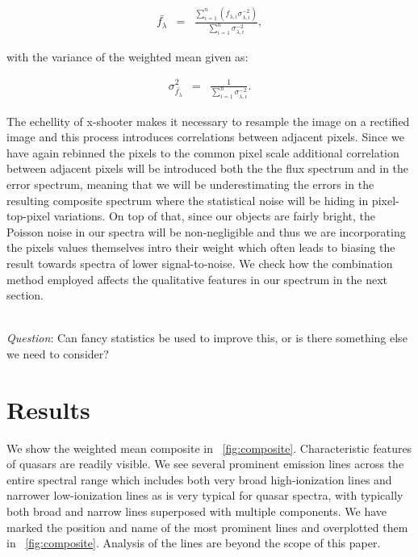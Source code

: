 \documentclass{aa}    %
\newcommand{\figref}[1]{\ref{fig:#1}}
\newcommand{\Fig}[1]{\figurename~\figref{#1}}
\newcommand{\fig}[1]{\Fig{#1}}
\newcommand{\eqlabel}[1]{\label{eq:#1}}
\newcommand{\sectlabel}[1]{\label{sect:#1}}
\newcommand{\todo}[3]{{\color{#2}\emph{#1}: #3}}
\newcommand{\qtodo}[1]{\todo{\\ Question}{red}{#1}}
\begin{document}
\begin{eqnarray} \eqlabel{wmean}
\bar{f_{\lambda}} &=& \frac{ \sum_{i=1}^n \left( f_{\lambda, i} \sigma_{\lambda, i}^{-2} \right)}{\sum_{i=1}^n \sigma_{\lambda, i}^{-2}},
\end{eqnarray}

with the variance of the weighted mean given as: 
 
\begin{eqnarray} \eqlabel{sigma-wmean}
\sigma_{\bar{f_{\lambda}}}^2 &=& \frac{ 1 }{\sum_{i=1}^n \sigma_{\lambda, i}^{-2}}.
\end{eqnarray}

The echellity of x-shooter makes it necessary to resample the image on a rectified image and this process introduces correlations between adjacent pixels. Since we have again rebinned the pixels to the common pixel scale additional correlation between adjacent pixels will be introduced both the the flux spectrum and in the error spectrum, meaning that we will be underestimating the errors in the resulting composite spectrum where the statistical noise will be hiding in pixel-top-pixel variations. On top of that, since our objects are fairly bright, the Poisson noise in our spectra will be non-negligible and thus we are incorporating the pixels values themselves intro their weight which often leads to biasing the result towards spectra of lower signal-to-noise. We check how the combination method employed affects the qualitative features in our spectrum in the next section.

\qtodo{Can fancy statistics be used to improve this, or is there something else we need to consider?}



\section{Results}   \sectlabel{results}


We show the weighted mean composite in \fig{composite}. Characteristic features of quasars are readily visible. We see several prominent emission lines across the entire spectral range which includes both very broad high-ionization lines and narrower low-ionization lines as is very typical for quasar spectra, with typically both broad and narrow lines superposed with multiple components. We have marked the position and name of the most prominent lines and overplotted them in \fig{composite}.  Analysis of the lines are beyond the scope of this paper.
\end{document}
